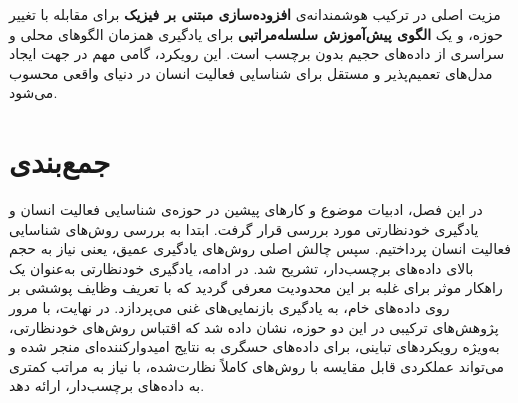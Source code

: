 مزیت اصلی  در ترکیب هوشمندانه‌ی \textbf{افزوده‌سازی مبتنی بر فیزیک} برای مقابله با تغییر حوزه، و یک \textbf{الگوی پیش‌آموزش سلسله‌مراتبی} برای یادگیری همزمان الگوهای محلی و سراسری از داده‌های حجیم بدون برچسب است. این رویکرد، گامی مهم در جهت ایجاد مدل‌های تعمیم‌پذیر و مستقل برای شناسایی فعالیت انسان در دنیای واقعی محسوب می‌شود.

\section{جمع‌بندی}

در این فصل، ادبیات موضوع و کارهای پیشین در حوزه‌ی شناسایی فعالیت انسان و یادگیری خودنظارتی مورد بررسی قرار گرفت. ابتدا به بررسی روش‌های شناسایی فعالیت انسان پرداختیم. سپس چالش اصلی روش‌های یادگیری عمیق، یعنی نیاز به حجم بالای داده‌های برچسب‌دار، تشریح شد. در ادامه، یادگیری خودنظارتی به‌عنوان یک راهکار موثر برای غلبه بر این محدودیت معرفی گردید که با تعریف وظایف پوششی بر روی داده‌های خام، به یادگیری بازنمایی‌های غنی می‌پردازد. در نهایت، با مرور پژوهش‌های ترکیبی در این دو حوزه، نشان داده شد که اقتباس روش‌های خودنظارتی، به‌ویژه رویکردهای تباینی، برای داده‌های حسگری به نتایج امیدوارکننده‌ای منجر شده و می‌تواند عملکردی قابل مقایسه با روش‌های کاملاً نظارت‌شده، با نیاز به مراتب کمتری به داده‌های برچسب‌دار، ارائه دهد.
